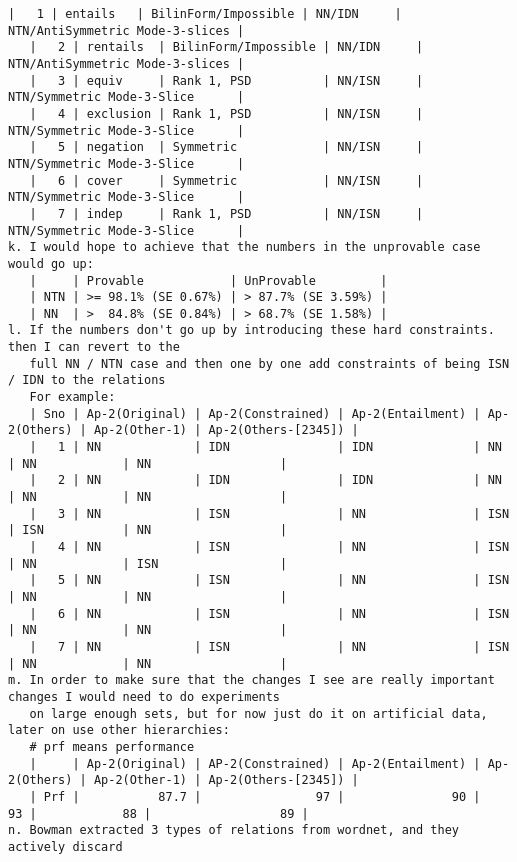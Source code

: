 \documentclass[12pt]{exam} %
\begin{document}
{\begin{Verbatim}[fontsize=\small]
   |   1 | entails   | BilinForm/Impossible | NN/IDN     | NTN/AntiSymmetric Mode-3-slices |
   |   2 | rentails  | BilinForm/Impossible | NN/IDN     | NTN/AntiSymmetric Mode-3-slices |
   |   3 | equiv     | Rank 1, PSD          | NN/ISN     | NTN/Symmetric Mode-3-Slice      |
   |   4 | exclusion | Rank 1, PSD          | NN/ISN     | NTN/Symmetric Mode-3-Slice      |
   |   5 | negation  | Symmetric            | NN/ISN     | NTN/Symmetric Mode-3-Slice      |
   |   6 | cover     | Symmetric            | NN/ISN     | NTN/Symmetric Mode-3-Slice      |
   |   7 | indep     | Rank 1, PSD          | NN/ISN     | NTN/Symmetric Mode-3-Slice      |
k. I would hope to achieve that the numbers in the unprovable case would go up:
   |     | Provable            | UnProvable         |
   | NTN | >= 98.1% (SE 0.67%) | > 87.7% (SE 3.59%) |
   | NN  | >  84.8% (SE 0.84%) | > 68.7% (SE 1.58%) |
l. If the numbers don't go up by introducing these hard constraints. then I can revert to the
   full NN / NTN case and then one by one add constraints of being ISN / IDN to the relations
   For example:
   | Sno | Ap-2(Original) | Ap-2(Constrained) | Ap-2(Entailment) | Ap-2(Others) | Ap-2(Other-1) | Ap-2(Others-[2345]) |
   |   1 | NN             | IDN               | IDN              | NN           | NN            | NN                  |
   |   2 | NN             | IDN               | IDN              | NN           | NN            | NN                  |
   |   3 | NN             | ISN               | NN               | ISN          | ISN           | NN                  |
   |   4 | NN             | ISN               | NN               | ISN          | NN            | ISN                 |
   |   5 | NN             | ISN               | NN               | ISN          | NN            | NN                  |
   |   6 | NN             | ISN               | NN               | ISN          | NN            | NN                  |
   |   7 | NN             | ISN               | NN               | ISN          | NN            | NN                  |
m. In order to make sure that the changes I see are really important changes I would need to do experiments
   on large enough sets, but for now just do it on artificial data, later on use other hierarchies:
   # prf means performance
   |     | Ap-2(Original) | AP-2(Constrained) | Ap-2(Entailment) | Ap-2(Others) | Ap-2(Other-1) | Ap-2(Others-[2345]) |
   | Prf |           87.7 |                97 |               90 |           93 |            88 |                  89 |
n. Bowman extracted 3 types of relations from wordnet, and they actively discard

\end{Verbatim}}
\end{document}
